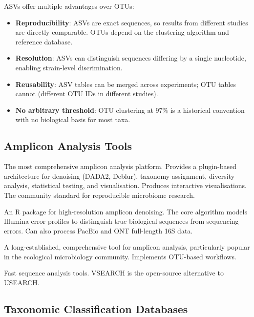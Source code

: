 \begin{keyconcept}[title={Why ASVs Have Replaced OTUs}]
ASVs offer multiple advantages over OTUs:
\begin{itemize}[nosep]
  \item \textbf{Reproducibility}: ASVs are exact sequences, so results from different studies are directly comparable. OTUs depend on the clustering algorithm and reference database.
  \item \textbf{Resolution}: ASVs can distinguish sequences differing by a single nucleotide, enabling strain-level discrimination.
  \item \textbf{Reusability}: ASV tables can be merged across experiments; OTU tables cannot (different OTU IDs in different studies).
  \item \textbf{No arbitrary threshold}: OTU clustering at 97\% is a historical convention with no biological basis for most taxa.
\end{itemize}
\end{keyconcept}

\subsection{Amplicon Analysis Tools}

\begin{description}[style=nextline]
  \item[QIIME 2] The most comprehensive amplicon analysis platform. Provides a plugin-based architecture for denoising (DADA2, Deblur), taxonomy assignment, diversity analysis, statistical testing, and visualisation. Produces interactive visualisations. The community standard for reproducible microbiome research.
  \item[DADA2] An R package for high-resolution amplicon denoising. The core algorithm models Illumina error profiles to distinguish true biological sequences from sequencing errors. Can also process PacBio and ONT full-length 16S data.
  \item[mothur] A long-established, comprehensive tool for amplicon analysis, particularly popular in the ecological microbiology community. Implements OTU-based workflows.
  \item[USEARCH / VSEARCH] Fast sequence analysis tools. VSEARCH is the open-source alternative to USEARCH.
\end{description}

\subsection{Taxonomic Classification Databases}

